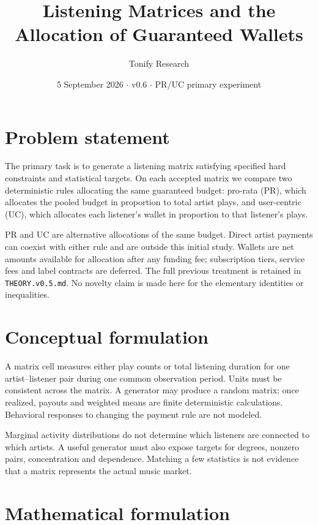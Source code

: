 \documentclass[11pt]{article}
\title{Listening Matrices and the Allocation of Guaranteed Wallets}
\author{Tonify Research}
\date{5 September 2026 $\cdot$ v0.6 $\cdot$ PR/UC primary experiment}
\begin{document}
\maketitle

\section{Problem statement}
The primary task is to generate a listening matrix satisfying specified
hard constraints and statistical targets. On each accepted matrix we
compare two deterministic rules allocating the same guaranteed budget:
pro-rata (PR), which allocates the pooled budget in proportion to total
artist plays, and user-centric (UC), which allocates each listener's wallet
in proportion to that listener's plays.

PR and UC are alternative allocations of the same budget. Direct artist
payments can coexist with either rule and are outside this initial study.
Wallets are net amounts available for allocation after any funding fee;
subscription tiers, service fees and label contracts are deferred.
The full previous treatment is retained in \texttt{THEORY.v0.5.md}.
No novelty claim is made here for the elementary identities or inequalities.

\section{Conceptual formulation}
A matrix cell measures either play counts or total listening duration for
one artist--listener pair during one common observation period. Units
must be consistent across the matrix. A generator may produce a random
matrix; once realized, payouts and weighted means are finite deterministic
calculations. Behavioral responses to changing the payment rule are not modeled.

Marginal activity distributions do not determine which listeners are
connected to which artists. A useful generator must also expose targets
for degrees, nonzero pairs, concentration and dependence. Matching a few
statistics is not evidence that a matrix represents the actual music market.

\section{Mathematical formulation}
\end{document}
